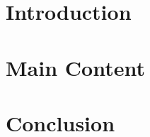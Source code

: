 \documentclass{article}
\begin{document}
\begin{multicols}{2} %

\section*{Introduction} %
\lipsum[1-2] %

\section*{Main Content}
\lipsum[3-4]

\section*{Conclusion}
\lipsum[5]

\end{multicols}
\end{document}
